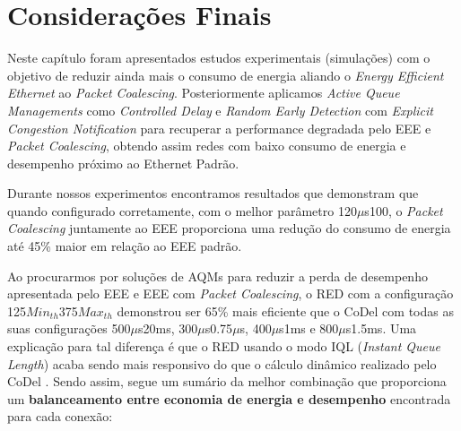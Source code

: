 \section{Considerações Finais}

Neste capítulo foram apresentados estudos experimentais (simulações) com o objetivo de reduzir ainda mais o consumo de energia aliando o \emph{Energy Efficient Ethernet} ao \emph{Packet Coalescing}. Posteriormente aplicamos \emph{Active Queue Managements} como \emph{Controlled Delay} e \emph{Random Early Detection} com \emph{Explicit Congestion Notification} para recuperar a performance degradada pelo EEE e \emph{Packet Coalescing}, obtendo assim redes com baixo consumo de energia e desempenho próximo ao Ethernet Padrão.

Durante nossos experimentos encontramos resultados que demonstram que quando configurado corretamente, com o melhor parâmetro 120$\mu$s100, o \emph{Packet Coalescing} juntamente ao EEE proporciona uma redução do consumo de energia até 45\% maior em relação ao EEE padrão.

Ao procurarmos por soluções de AQMs para reduzir a perda de desempenho apresentada pelo EEE e EEE com \emph{Packet Coalescing}, o RED com a configuração 125{$\mathit{Min}_\mathit{th}$}375{$\mathit{Max}_\mathit{th}$} demonstrou ser 65\% mais eficiente que o CoDel com todas as suas configurações 500$\mu$s20ms, 300$\mu$s0.75$\mu$s, 400$\mu$s1ms e 800$\mu$s1.5ms. Uma explicação para tal diferença é que o RED usando o modo IQL (\emph{Instant Queue Length}) acaba sendo mais responsivo do que o cálculo dinâmico realizado pelo CoDel \cite{silva2018eon}. Sendo assim, segue um sumário da melhor combinação que proporciona um \textbf{balanceamento entre economia de energia e desempenho} encontrada para cada conexão:

